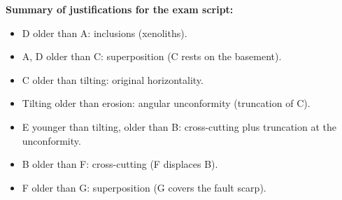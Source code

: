 \documentclass[11pt]{article}
\begin{document}
\begin{exoresolu}
\textbf{Summary of justifications for the exam script:}
\begin{itemize}
    \item D older than A: inclusions (xenoliths).
    \item A, D older than C: superposition (C rests on the basement).
    \item C older than tilting: original horizontality.
    \item Tilting older than erosion: angular unconformity (truncation of C).
    \item E younger than tilting, older than B: cross-cutting plus truncation at the unconformity.
    \item B older than F: cross-cutting (F displaces B).
    \item F older than G: superposition (G covers the fault scarp).
\end{itemize}
\end{exoresolu}
\end{document}
